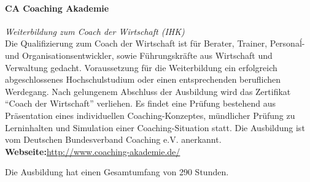 \documentclass[11pt,a4paper]{article}
\begin{document}
\paragraph{\textsf{CA Coaching Akademie}} \textsl{Weiterbildung zum Coach der Wirtschaft (IHK)}\\
Die Qualifizierung zum Coach der Wirtschaft ist für Berater, Trainer, Personaĺ- und Organisationsentwickler, sowie Führungskräfte aus Wirtschaft und Verwaltung gedacht. Voraussetzung für die Weiterbildung ein erfolgreich abgeschlossenes Hochschulstudium oder einen entsprechenden beruflichen Werdegang. Nach gelungenem Abschluss der Ausbildung wird das Zertifikat "`Coach der Wirtschaft"' verliehen. Es findet eine Prüfung bestehend aus Präsentation eines individuellen Coaching-Konzeptes, mündlicher Prüfung zu Lerninhalten und Simulation einer Coaching-Situation statt. Die Ausbildung ist vom Deutschen Bundesverband Coaching e.V. anerkannt.
\textbf{Webseite:}\textsf{\textcolor{MidnightBlue}{\url{http://www.coaching-akademie.de/}}}


Die Ausbildung hat einen Gesamtumfang von 290 Stunden.
\end{document}
